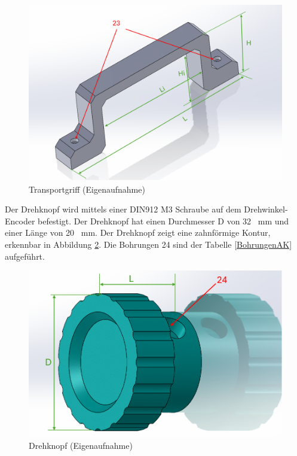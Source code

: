 	\begin{figure}[H]
		\begin{center}
			\includegraphics[width=\textwidth]{Images/Konstruktion/GriffK.png}
			\caption{Transportgriff (Eigenaufnahme)} \label{GriffK}
		\end{center}
	\end{figure}  

Der Drehknopf wird mittels einer DIN912 M3 Schraube auf dem Drehwinkel-Encoder befestigt. Der Drehknopf hat einen Durchmesser D von 32 \ mm und einer Länge von 20 \ mm. Der Drehknopf zeigt eine zahnförmige Kontur, erkennbar in Abbildung \ref{DrehKnopfK}. Die Bohrungen 24 sind der Tabelle \ref{BohrungenAK} aufgeführt.
	
	\begin{figure}[H]
		\begin{center}
			\includegraphics[width=\textwidth]{Images/Konstruktion/DrehKnopfK.png}
			\caption{Drehknopf (Eigenaufnahme)} \label{DrehKnopfK}
		\end{center}
	\end{figure}  

